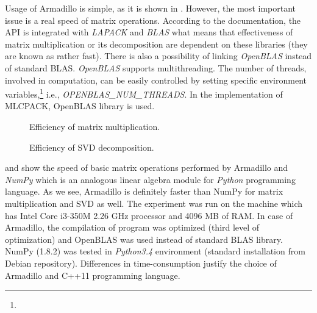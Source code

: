 \documentclass[english,a4paper,twoside]{ppfcmthesis}
\begin{document}
Usage of Armadillo is simple, as it is shown in . However, the most important issue is a real speed of matrix operations. According to the documentation, the API is integrated with \textit{LAPACK} and \textit{BLAS} what means that effectiveness of matrix multiplication or its decomposition are dependent on these libraries (they are known as rather fast). There is also a possibility of linking \textit{OpenBLAS} instead of standard BLAS. \textit{OpenBLAS} supports multithreading. The number of threads, involved in computation, can be easily controlled by setting specific environment variables,\footnote{} i.e., \textit{OPENBLAS\_NUM\_THREADS}. In the implementation of MLCPACK, OpenBLAS library is used.    

\begin{figure}[h]
\centering
\caption{Efficiency of matrix multiplication.}
\label{fig:mulperf}
\end{figure}

\begin{figure}[h]
\centering
\caption{Efficiency of SVD decomposition.}
\label{fig:svdperf}
\end{figure}


 and  show the speed of basic matrix operations performed by Armadillo and \textit{NumPy} which is an analogous linear algebra module for \textit{Python} programming language. As we see, Armadillo is definitely faster than NumPy for matrix multiplication and SVD as well.   
The experiment was run on the machine which has Intel Core i3-350M 2.26 GHz processor and 4096 MB of RAM. In case of Armadillo, the compilation of program was optimized (third level of optimization) and OpenBLAS was used instead of standard BLAS library. NumPy (1.8.2) was tested in \textit{Python3.4} environment (standard installation from Debian repository). Differences in time-consumption justify the choice of Armadillo and C++11 programming language.
\end{document}
